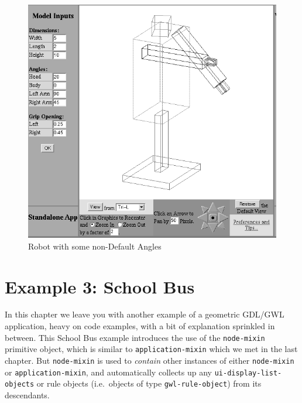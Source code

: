 \documentclass [11pt]{book}
\begin{document}
\begin{figure}
\begin{center}
\includegraphics{../images/robot-swing.png}
\end{center}

\caption{Robot with some non-Default Angles}

\label{fig:robot-swing}

\end{figure}


\chapter{Example 3: School Bus}

\label{chap:example3:schoolbus}

In this chapter we leave you with another example of a geometric
GDL/GWL application, heavy on code examples, with a bit of explanation
sprinkled in between. This School Bus example introduces the use of
the \texttt{node-mixin} primitive object, which is similar to \texttt{application-mixin} which we met in the last chapter. But \texttt{node-mixin} is used to \emph{contain} other instances of either \texttt{node-mixin} or \texttt{application-mixin}, and automatically collects up any \texttt{ui-display-list-objects} or rule objects (i.e.\ objects of type \texttt{gwl-rule-object}) from its descendants.
\end{document}
